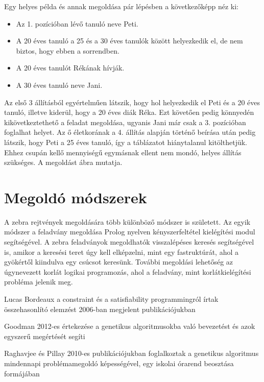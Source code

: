 \documentclass[12pt,a4paper,oneside]{report}
\begin{document}
Egy helyes példa és annak megoldása pár lépésben a következőképp néz ki:
\begin{itemize}
\item Az 1. pozícióban lévő tanuló neve Peti.
\item A 20 éves tanuló a 25 és a 30 éves tanulók között helyezkedik el, de nem biztos, hogy ebben a sorrendben.
\item A 20 éves tanulót Rékának hívják.
\item A 30 éves tanuló neve Jani.
\end{itemize}

Az első 3 állításból egyértelműen látszik, hogy hol helyezkedik el Peti és a 20 éves tanuló, illetve kiderül, hogy a 20 éves diák Réka. Ezt követően pedig könnyedén kikövetkeztethető a feladat megoldása, ugyanis Jani már csak a 3. pozícióban foglalhat helyet. Az ő életkorának a 4. állítás alapján történő beírása után pedig látszik, hogy Peti a 25 éves tanuló, így a táblázatot hiánytalanul kitölthetjük. Ehhez csupán kellő mennyiségű egymásnak ellent nem mondó, helyes állítás szükséges. A megoldást  ábra mutatja.


    \section{Megoldó módszerek} %

A zebra rejtvények megoldására több különböző módszer is született. 
Az egyik módszer a feladvány megoldása Prolog nyelven kényszerfeltétel kielégítési modul segítségével. 
A zebra feladványok megoldhatók visszalépéses keresés segítségével is, amikor a keresési teret úgy kell elképzelni, mint egy fastruktúrát, ahol a gyökértől kiindulva egy csúcsot keresünk.
További megoldási lehetőség az úgynevezett korlát logikai programozás, ahol a feladvány, mint korlátkielégítési probléma jelenik meg.

Lucas Bordeaux a constraint és a satisfiability programmingról írtak összehasonlító elemzést 2006-ban megjelent publikációjukban\cite{Bordeaux:2006:PSC:1177352.1177354}

Goodman 2012-es értekezése a genetikus algoritmusokba való bevezetést és azok egyszerű megértését segíti\cite{Goodman:2012:IGA:2330784.2330911}

Raghavjee és Pillay 2010-es publikációjukban foglalkoztak a genetikus algoritmus mindennapi problémamegoldó képességével, egy iskolai órarend beosztása formájában\cite{Raghavjee:2010:IGA:1899503.1899555}
\end{document}
